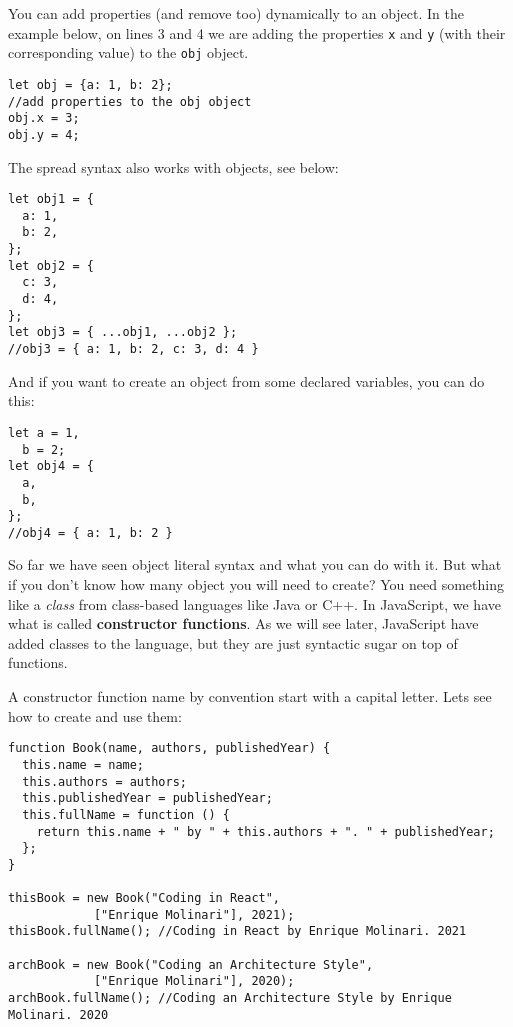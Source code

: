 \documentclass[a4paper, oneside, titlepage, 12pt]{book}
\begin{document}
You can add properties (and remove too) dynamically to an object. In the example below, on lines 3 and 4 we are adding the properties \texttt{x} and \texttt{y} (with their corresponding value) to the \texttt{obj} object.

\begin{verbatim}
let obj = {a: 1, b: 2};
//add properties to the obj object
obj.x = 3;
obj.y = 4;
\end{verbatim}

The spread syntax also works with objects, see below:

\begin{verbatim}
let obj1 = {
  a: 1,
  b: 2,
};
let obj2 = {
  c: 3,
  d: 4,
};
let obj3 = { ...obj1, ...obj2 };
//obj3 = { a: 1, b: 2, c: 3, d: 4 }
\end{verbatim}

And if you want to create an object from some declared variables, you can do this:

\begin{verbatim}
let a = 1,
  b = 2;
let obj4 = {
  a,
  b,
};
//obj4 = { a: 1, b: 2 }	
\end{verbatim}

So far we have seen object literal syntax and what you can do with it. But what if you don't know how many object you will need to create? You need something like a \textit{class} from class-based languages like Java or C++. In JavaScript, we have what is called \textbf{constructor functions}. As we will see later, JavaScript have added classes to the language, but they are just syntactic sugar on top of functions.

A constructor function name by convention start with a capital letter. Lets see how to create and use them:

\begin{verbatim}
function Book(name, authors, publishedYear) {
  this.name = name;
  this.authors = authors;
  this.publishedYear = publishedYear;
  this.fullName = function () {
    return this.name + " by " + this.authors + ". " + publishedYear;
  };
}

thisBook = new Book("Coding in React", 
			["Enrique Molinari"], 2021);
thisBook.fullName(); //Coding in React by Enrique Molinari. 2021

archBook = new Book("Coding an Architecture Style", 
			["Enrique Molinari"], 2020);
archBook.fullName(); //Coding an Architecture Style by Enrique Molinari. 2020 
\end{verbatim}
\end{document}
